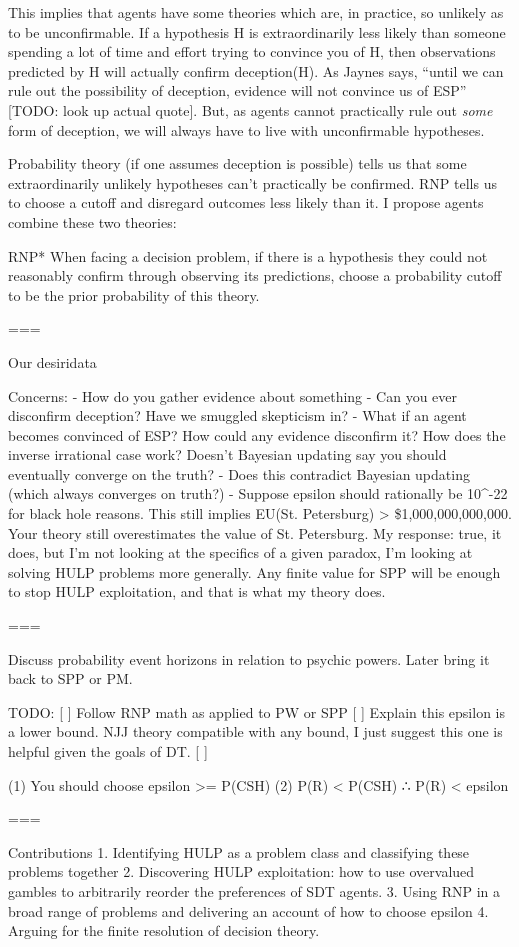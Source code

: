 This implies that agents have some theories which are, in practice, so unlikely as to be unconfirmable. If a hypothesis H is extraordinarily less likely than someone spending a lot of time and effort trying to convince you of H, then observations predicted by H will actually confirm deception(H). As Jaynes says, ``until we can rule out the possibility of deception, evidence will not convince us of ESP'' [TODO: look up actual quote]. But, as agents cannot practically rule out \textit{some} form of deception, we will always have to live with unconfirmable hypotheses.

Probability theory (if one assumes deception is possible) tells us that some extraordinarily unlikely hypotheses can't practically be confirmed. RNP tells us to choose a cutoff and disregard outcomes less likely than it. I propose agents combine these two theories:

RNP* When facing a decision problem, if there is a hypothesis they could not reasonably confirm through observing its predictions, choose a probability cutoff \epsilon to be the prior probability of this theory.

=== 

Our desiridata

Concerns:
 - How do you gather evidence about something
 - Can you ever disconfirm deception? Have we smuggled skepticism in?
 - What if an agent becomes convinced of ESP? How could any evidence disconfirm it? How does the inverse irrational case work? Doesn't Bayesian updating say you should eventually converge on the truth?
 - Does this contradict Bayesian updating (which always converges on truth?)
 - Suppose epsilon should rationally be 10^-22 for black hole reasons. This still implies EU(St. Petersburg) > \$1,000,000,000,000. Your theory still overestimates the value of St. Petersburg. My response: true, it does, but I'm not looking at the specifics of a given paradox, I'm looking at solving HULP problems more generally. Any finite value for SPP will be enough to stop HULP exploitation, and that is what my theory does.

===

Discuss probability event horizons in relation to psychic powers. Later bring it back to SPP or PM.

TODO:
[ ] Follow RNP math as applied to PW or SPP
[ ] Explain this epsilon is a lower bound. NJJ theory compatible with any bound, I just suggest this one is helpful given the goals of DT.
[ ] 

(1) You should choose epsilon >= P(CSH)
(2) P(R) < P(CSH)
 ∴  P(R) < epsilon

===



Contributions
1. Identifying HULP as a problem class and classifying these problems together
2. Discovering HULP exploitation: how to use overvalued gambles to arbitrarily reorder the preferences of SDT agents.
3. Using RNP in a broad range of problems and delivering an account of how to choose epsilon 
4. Arguing for the finite resolution of decision theory.
